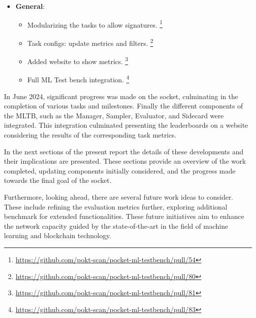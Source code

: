 \begin{itemize}[noitemsep]
\begin{itemize}[noitemsep]
\begin{itemize}[noitemsep]
                \item Added endpoint for tokenizer in llm nodes. \footnote{\url{https://github.com/pokt-scan/pocket-ml-testbench/pull/56}}                
            \end{itemize}
        \item \textbf{General}:
            \begin{itemize}[noitemsep]
                \item Modularizing the tasks to allow signatures. \footnote{\url{https://github.com/pokt-scan/pocket-ml-testbench/pull/54}}
                \item Task configs: update metrics and filters. \footnote{\url{https://github.com/pokt-scan/pocket-ml-testbench/pull/80}}
                \item Added website to show metrics. \footnote{\url{https://github.com/pokt-scan/pocket-ml-testbench/pull/81}}
                \item Full ML Test bench integration. \footnote{\url{https://github.com/pokt-scan/pocket-ml-testbench/pull/83}}            
            \end{itemize}
    \end{itemize}
\end{itemize}

In June 2024, significant progress was made on the socket, culminating in the completion of various tasks and milestones. 
Finally the different components of the \gls{MLTB}, such as the Manager, Sampler, Evaluator, and Sidecard were integrated. 
This integration culminated presenting the leaderboards on a website considering the results of the corresponding task metrics.

In the next sections of the present report the details of these developments and their implications are presented. 
These sections provide an overview of the work completed, updating components initially considered, and the progress made towards the final goal of the socket.

Furthermore, looking ahead, there are several future work ideas to consider. 
These include refining the evaluation metrics further, exploring additional benchmark for extended functionalities. 
These future initiatives aim to enhance the network capacity guided by the state-of-the-art in the field of machine learning and blockchain technology.


